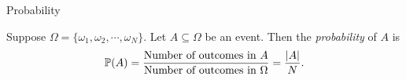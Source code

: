 %
\begin{note}
  \begin{field}
    Probability
  \end{field}
  \begin{field}
    \begin{defi}[Probability]
      Suppose $\Omega = \{\omega_1,\omega_2, \cdots, \omega_N\}$. Let $A\subseteq \Omega$ be an event. Then the \emph{probability} of $A$ is
      \[
        \P(A) = \frac{\text{Number of outcomes in } A}{\text{Number of outcomes in }\Omega} = \frac{|A|}{N}.
      \]
    \end{defi}
  \end{field}
  \xplain{}%
\end{note}

